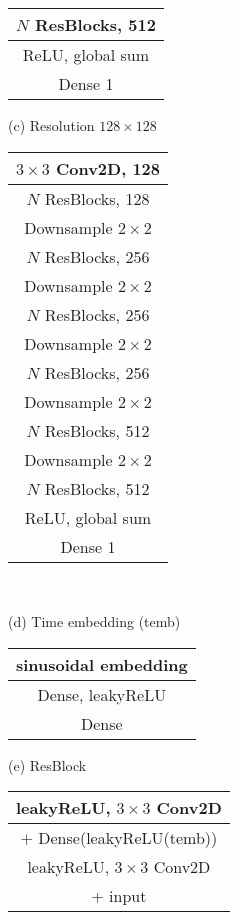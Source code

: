 \documentclass{article} \usepackage{iclr2021_conference,times}
\begin{document}
\begin{table}[ht]
\begin{minipage}[t]{.3\textwidth}
\begin{tabular}{c}
     \midrule 
     $N$ ResBlocks, 512 \\
    \midrule 
    ReLU, global sum\\
    Dense 1 \\
    \bottomrule 
\end{tabular}
 \end{minipage}
  \begin{minipage}[t]{.3\textwidth}
  \centering
 (c) Resolution $128 \times 128$ \\
 \begin{tabular}{c}
    \toprule
    $3 \times 3$ Conv2D, 128 \\
    \midrule
    $N$ ResBlocks, 128\\
    Downsample $2 \times 2$\\
    \midrule
    $N$ ResBlocks, 256 \\
    Downsample $2 \times 2$\\
    \midrule 
   $N$ ResBlocks, 256 \\
    Downsample $2 \times 2$\\
     \midrule 
   $N$ ResBlocks, 256 \\
    Downsample $2 \times 2$\\
     \midrule 
    $N$ ResBlocks, 512 \\
    Downsample $2 \times 2$\\
     \midrule
     $N$ ResBlocks, 512 \\
    \midrule 
    ReLU, global sum\\
    Dense 1 \\
    \bottomrule 
\end{tabular}
 \end{minipage}\\
  \begin{minipage}[t]{.3\textwidth}
  \centering
 (d) Time embedding (temb) \\
 \begin{tabular}{c}
    \toprule
 sinusoidal embedding \\
 \midrule
 Dense, leakyReLU\\
 \midrule
Dense\\
    \bottomrule 
\end{tabular}
 \end{minipage} 
  \begin{minipage}[t]{.3\textwidth}
  \centering
 (e) ResBlock \\
 \begin{tabular}{c}
    \toprule
 leakyReLU, $3 \times 3$ Conv2D \\
 \midrule
 $+$ Dense(leakyReLU(temb))\\
 \midrule
 leakyReLU, $3 \times 3$ Conv2D\\
 \midrule
 + input \\
    \bottomrule 
\end{tabular}
 \end{minipage}
    \label{tabl:structure}
\end{table}
\end{document}
